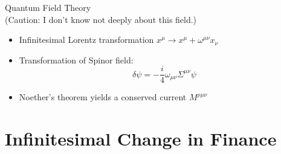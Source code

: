 \documentclass{article}
\begin{document}
\begin{description}
\begin{itemize}
          \end{itemize}
    \item[Observation] Quantum Field Theory \\(Caution: I don't know not deeply about this field.)
          \begin{itemize}
              \item
                    Infinitesimal Lorentz transformation $x^\mu \to x^\mu + \omega^{\mu\nu}x_\nu$
              \item Transformation of Spinor field:
                    \begin{equation}
                        \delta \psi = -\frac{i}{4} \omega_{\mu\nu} \Sigma^{\mu\nu} \psi
                    \end{equation}
              \item
                    Noether's theorem yields a conserved current $M^{\rho\mu\nu}$
          \end{itemize}
\end{description}

\section{Infinitesimal Change in Finance}
\end{document}
